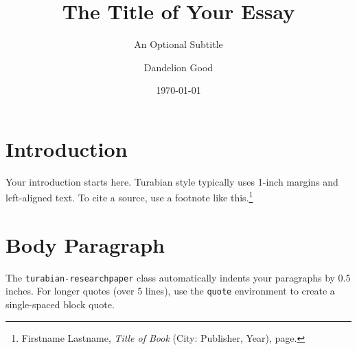 \documentclass{turabian-researchpaper} %
\title{The Title of Your Essay}
\subtitle{An Optional Subtitle}
\author{Dandelion Good}
\date{\today}
\begin{document}
	
	\maketitle %
	
	\section*{Introduction}
	Your introduction starts here. Turabian style typically uses 1-inch margins and left-aligned text. To cite a source, use a footnote like this.\footnote{Firstname Lastname, \textit{Title of Book} (City: Publisher, Year), page.} 
	
	\section*{Body Paragraph}
	The \texttt{turabian-researchpaper} class automatically indents your paragraphs by 0.5 inches. For longer quotes (over 5 lines), use the \texttt{quote} environment to create a single-spaced block quote.
	
	\newpage
	\printbibliography %
	
\end{document}
